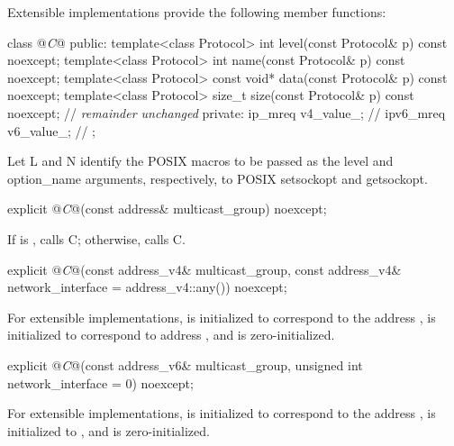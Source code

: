 \pnum
 Extensible implementations provide the following member functions:

\begin{codeblock}
class @\textit{C}@
{
public:
  template<class Protocol> int level(const Protocol& p) const noexcept;
  template<class Protocol> int name(const Protocol& p) const noexcept;
  template<class Protocol> const void* data(const Protocol& p) const noexcept;
  template<class Protocol> size_t size(const Protocol& p) const noexcept;
  // \textit{remainder unchanged}
private:
  ip_mreq v4_value_; // \expos
  ipv6_mreq v6_value_; // \expos
};
\end{codeblock}

\pnum
Let L and N identify the POSIX macros to be passed as the level and option_name arguments, respectively, to POSIX setsockopt and getsockopt.

\begin{itemdecl}
explicit @\textit{C}@(const address& multicast_group) noexcept;
\end{itemdecl}

\begin{itemdescr}
\pnum
\effects If  is , calls C; otherwise, calls C.
\end{itemdescr}

\begin{itemdecl}
explicit @\textit{C}@(const address_v4& multicast_group,
           const address_v4& network_interface = address_v4::any()) noexcept;
\end{itemdecl}

\begin{itemdescr}
\pnum
\effects For extensible implementations,  is initialized to correspond to the address ,  is initialized to correspond to address , and  is zero-initialized.
\end{itemdescr}

\begin{itemdecl}
explicit @\textit{C}@(const address_v6& multicast_group,
           unsigned int network_interface = 0) noexcept;
\end{itemdecl}

\begin{itemdescr}
\pnum
\effects For extensible implementations,  is initialized to correspond to the address ,  is initialized to , and  is zero-initialized.
\end{itemdescr}

